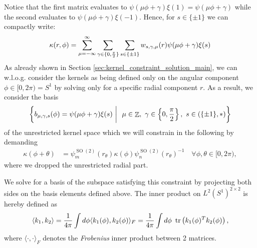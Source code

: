 \documentclass{article}
\newcommand{\lp}{\left(}
\newcommand{\rp}{\right)}
\DeclareMathOperator*{\tr}{\operatorname{tr}}
\DeclareMathOperator*{\Z}{\mathbb{Z}}
\newcommand{\SO}[1]{\ensuremath{\operatorname{SO}(#1)}}
\newcommand{\Flip}{(\{\pm 1\}, *)}
\newcommand{\PSI}[1]{
	\begin{bmatrix}
		\cos\lp#1\rp & \!\!\!         \shortminus \sin\lp#1\rp \\
		\sin\lp#1\rp & \!\!\!\phantom{\shortminus}\cos\lp#1\rp \\
	\end{bmatrix}
}
\newcommand{\PSIS}[1]{
	\begin{bmatrix}
		\cos\lp#1\rp & \!\!\!\phantom{\shortminus}\sin\lp#1\rp \\
		\sin\lp#1\rp & \!\!\!         \shortminus \cos\lp#1\rp \\
	\end{bmatrix}
}
\begin{document}
\scalebox{.985}{\parbox{\linewidth}{\begin{align*}
\kappa(r,\!\phi) =\!\!\!\!\sum_{\mu=\shortminus\infty\ \ }^{\infty}\!\!\!\!\!\!\!\!\!\sum_{\ \ \ \ \gamma \in \{0, {\pi\over2}\}} \!\!\!\!\!\! w_{0,\gamma,\mu}(r) \!\! \PSI{\mu\phi \!+\!\gamma} \! + \! w_{1,\gamma,\mu}(r)\!\! \PSIS{\mu\phi\! +\! \gamma}
\end{align*}
}}
Notice that the first matrix evaluates to $\psi(\mu\phi + \gamma) \xi(1) = \psi(\mu\phi + \gamma)$ while the second evaluates to $\psi(\mu\phi + \gamma) \xi(-1)$.
Hence, for $s \in \{\pm 1\}$ we can compactly write:
\begin{align*}
	\kappa(r, \phi) = \sum_{\mu=-\infty}^{\infty} \sum_{\gamma \in \{0, {\pi\over2}\}} \sum_{s\in\{\pm1\}} w_{s, \gamma,\mu}(r) \psi(\mu\phi +\gamma) \xi(s)
\end{align*}
As already shown in Section \ref{sec:kernel_constraint_solution_main}, we can w.l.o.g. consider the kernels as being defined only on the angular component $\phi\in[0,2\pi)=S^1$ by solving only for a specific radial component $r$.
As a result, we consider the basis
\begin{align}
	\label{eq:so2_2x2_starting_basis}
	\left\{ b_{\mu,\gamma,s}(\phi) = \psi(\mu\phi +\gamma) \xi(s) \ \bigg|\ \ \mu \in \Z,\ \gamma \in \left\{0, {\pi\over2}\right\},\ s \in \Flip \right\}
\end{align}
of the unrestricted kernel space
which we will constrain in the following by demanding
\begin{align}
\label{eq:angular_kernel_constraint_appendix}
	\kappa(\phi + \theta) &= \psi_m^{\SO2}(r_\theta)\kappa(\phi) \psi_n^{\SO2}(r_\theta)^{-1} \quad\forall \phi,\theta\in[0,2\pi),
\end{align}
where we dropped the unrestricted radial part.

We solve for a basis of the subspace satisfying this constraint by projecting both sides on the basis elements defined above.
The inner product on $L^2\!\left(S^1\right)^{2\times2}$ is hereby defined as
\[
	\langle k_1, k_2\rangle = {1\over4\pi}\int d\phi \langle k_1(\phi), k_2(\phi)\rangle_{F} = {1\over4\pi}\int d\phi \ \tr\lp k_1(\phi)^T k_2(\phi) \rp,
\]
where $\langle \cdot, \cdot\rangle_F$ denotes the \textit{Frobenius} inner product between 2 matrices.
\end{document}
